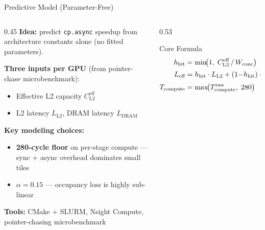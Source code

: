 \documentclass[aspectratio=169,10pt]{beamer}
\begin{document}
\begin{frame}{Predictive Model (Parameter-Free)}

\begin{columns}[T]
\begin{column}{0.45\textwidth}
\textbf{Idea:} predict \texttt{cp.async} speedup from architecture constants alone (no fitted parameters).

\vspace{0.8em}
\textbf{Three inputs per GPU} (from pointer-chase microbenchmark):
\begin{itemize}\scriptsize
    \item Effective L2 capacity $C_{\text{L2}}^{\text{eff}}$
    \item L2 latency $L_{\text{L2}}$, DRAM latency $L_{\text{DRAM}}$
\end{itemize}

\vspace{0.8em}
\textbf{Key modeling choices:}
\begin{itemize}\scriptsize
    \item \textbf{280-cycle floor} on per-stage compute --- sync + async overhead dominates small tiles
    \item \textbf{$\alpha{=}0.15$} --- occupancy loss is highly sub-linear
\end{itemize}

\vspace{0.8em}
\scriptsize
\textbf{Tools:} CMake + SLURM, Nsight Compute, pointer-chasing microbenchmark
\end{column}

\begin{column}{0.53\textwidth}
\begin{block}{\small Core Formula}
\vspace{-0.3em}
\scriptsize
\begin{align*}
h_{\text{hit}} &= \min\!\bigl(1,\; C_{\text{L2}}^{\text{eff}} \,/\, W_{\text{conc}}\bigr)
    & & \text{\tiny L2 hit fraction} \\[2pt]
L_{\text{eff}} &= h_{\text{hit}} \cdot L_{\text{L2}} + (1{-}h_{\text{hit}}) \cdot L_{\text{DRAM}}
    & & \text{\tiny effective memory latency (cycles)} \\[2pt]
T_{\text{compute}} &= \max\!\bigl(T_{\text{compute}}^{\text{raw}},\; 280\bigr)
    & & \text{\tiny per-stage compute window (cycles)}
\end{align*}
\end{block}


\end{column}
\end{columns}
\end{frame}
\end{document}

